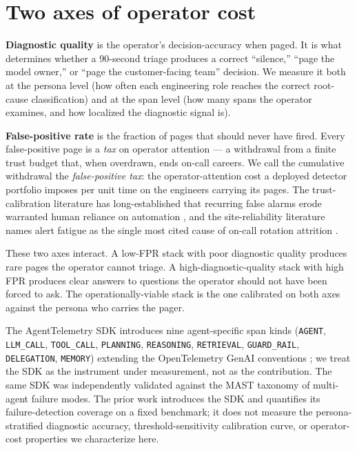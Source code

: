 \documentclass[journal]{IEEEtran}
\begin{document}
\section{Two axes of operator cost}

\textbf{Diagnostic quality} is the operator's decision-accuracy when paged. It is what determines whether a 90-second triage produces a correct ``silence,'' ``page the model owner,'' or ``page the customer-facing team'' decision. We measure it both at the persona level (how often each engineering role reaches the correct root-cause classification) and at the span level (how many spans the operator examines, and how localized the diagnostic signal is).

\textbf{False-positive rate} is the fraction of pages that should never have fired. Every false-positive page is a \emph{tax} on operator attention --- a withdrawal from a finite trust budget that, when overdrawn, ends on-call careers. We call the cumulative withdrawal the \emph{false-positive tax}: the operator-attention cost a deployed detector portfolio imposes per unit time on the engineers carrying its pages. The trust-calibration literature has long-established that recurring false alarms erode warranted human reliance on automation \cite{okamura2020}, and the site-reliability literature names alert fatigue as the single most cited cause of on-call rotation attrition \cite{srebook}.

These two axes interact. A low-FPR stack with poor diagnostic quality produces rare pages the operator cannot triage. A high-diagnostic-quality stack with high FPR produces clear answers to questions the operator should not have been forced to ask. The operationally-viable stack is the one calibrated on both axes against the persona who carries the pager.

The AgentTelemetry SDK \cite{aiware2026} introduces nine agent-specific span kinds (\texttt{AGENT}, \texttt{LLM\_CALL}, \texttt{TOOL\_CALL}, \texttt{PLANNING}, \texttt{REASONING}, \texttt{RETRIEVAL}, \texttt{GUARD\_RAIL}, \texttt{DELEGATION}, \texttt{MEMORY}) extending the OpenTelemetry GenAI conventions \cite{otel}; we treat the SDK as the instrument under measurement, not as the contribution. The same SDK was independently validated against the MAST taxonomy \cite{mast} of multi-agent failure modes. The prior work introduces the SDK and quantifies its failure-detection coverage on a fixed benchmark; it does not measure the persona-stratified diagnostic accuracy, threshold-sensitivity calibration curve, or operator-cost properties we characterize here.
\end{document}
